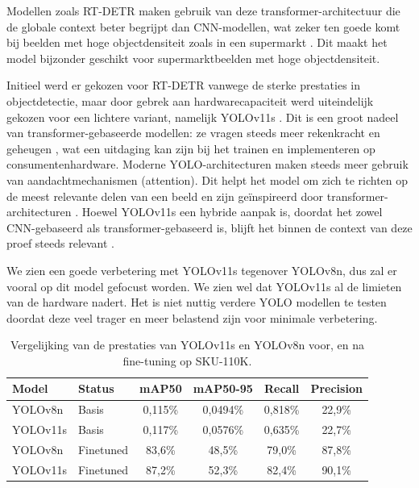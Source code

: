 Modellen zoals RT-DETR maken gebruik van deze transformer-architectuur die de globale context beter begrijpt dan CNN-modellen, wat zeker ten goede komt bij beelden met hoge objectdensiteit zoals in een supermarkt \autocite{carion2020endtoendobjectdetectiontransformers}.
Dit maakt het model bijzonder geschikt voor supermarktbeelden met hoge objectdensiteit.

Initieel werd er gekozen voor RT-DETR vanwege de sterke prestaties in objectdetectie, maar door gebrek aan hardwarecapaciteit werd uiteindelijk gekozen voor een lichtere variant, namelijk YOLOv11s \autocite{ultralytics_docs}. 
Dit is een groot nadeel van transformer-gebaseerde modellen: ze vragen steeds meer rekenkracht en geheugen \autocite{zhao2024detrsbeatyolosrealtime}, wat een uitdaging kan zijn bij het trainen en implementeren op consumentenhardware.
Moderne YOLO-architecturen maken steeds meer gebruik van aandachtmechanismen (attention). Dit helpt het model om zich te richten op de meest relevante delen van een beeld en zijn geïnspireerd door transformer-architecturen \autocite{vaswani2023attentionneed}.
Hoewel YOLOv11s een hybride aanpak is, doordat het zowel CNN-gebaseerd als transformer-gebaseerd is, blijft het binnen de context van deze proef steeds relevant \autocite{yolo11_ultralytics}.

We zien een goede verbetering met YOLOv11s tegenover YOLOv8n, dus zal er vooral op dit model gefocust worden. We zien wel dat YOLOv11s al de limieten van de hardware nadert. Het is niet nuttig verdere YOLO modellen te testen doordat deze veel trager en meer belastend zijn voor minimale verbetering.

\begin{table}[h]
\centering
\begin{tabular}{llcccc}
\hline
Model & Status & mAP50 & mAP50-95 & Recall & Precision \\ 
\hline
YOLOv8n  & Basis & 0,115\% & 0,0494\% & 0,818\% & 22,9\% \\
YOLOv11s & Basis & 0,117\% & 0,0576\% & 0,635\% & 22,7\% \\
YOLOv8n  & Finetuned   & 83,6\% & 48,5\% & 79,0\% & 87,8\% \\
YOLOv11s & Finetuned   & 87,2\% & 52,3\% & 82,4\% & 90,1\% \\
\hline
\end{tabular}
\caption{Vergelijking van de prestaties van YOLOv11s en YOLOv8n voor, en na fine-tuning op SKU-110K.}
\label{tab:yolo_resultaten}
\end{table}

